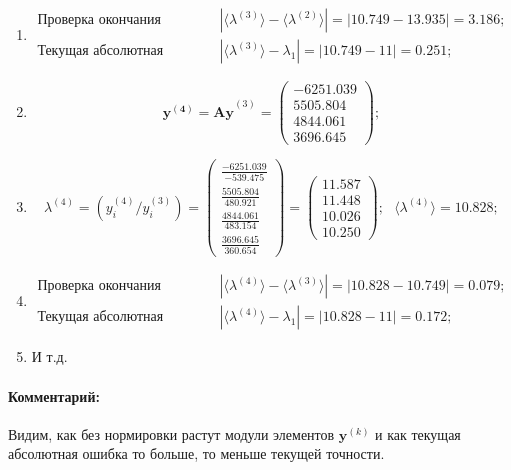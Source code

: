 \begin{enumerate}
\item $$
    \begin{matrix}
        \text{Проверка окончания алгоритма: }&|\langle\lambda^{(3)}\rangle - \langle\lambda^{(2)}\rangle| = |10.749 -13.935| =   \mathbf{3.186};\\
        \text{Текущая абсолютная ошибка: }&|\langle\lambda^{(3)}\rangle - \lambda_1| = |10.749 - 11| = \mathbf{0.251};
    \end{matrix}$$



\item $$
    \mathbf{y^{(4)} =Ay}^{(3)} = \begin{pmatrix}-6251.039\\5505.804\\4844.061\\3696.645\end{pmatrix};$$

\item $$
    \lambda^{(4)} =\left( y^{(4)}_i / y^{(3)}_i \right) =
    \begin{pmatrix} \frac{-6251.039}{-539.475}\\\frac{5505.804}{480.921}\\\frac{4844.061}{483.154}\\\frac{3696.645}{360.654}\end{pmatrix}=
    \begin{pmatrix} 11.587\\11.448\\10.026\\10.250\end{pmatrix}; ~~~
    \langle\lambda^{(4)}\rangle = 10.828;$$

\item $$
    \begin{matrix}
        \text{Проверка окончания алгоритма: }&|\langle\lambda^{(4)}\rangle - \langle\lambda^{(3)}\rangle| = |10.828-10.749|    = \mathbf{0.079};\\
        \text{Текущая абсолютная ошибка: }&|\langle\lambda^{(4)}\rangle - \lambda_1| = |10.828 - 11| = \mathbf{0.172};
    \end{matrix}$$

\item И т.д.
\end{enumerate}
\paragraph{Комментарий:} Видим, как без нормировки растут модули элементов $\mathbf{y}^{(k)}$ и как текущая абсолютная ошибка то больше, то меньше текущей точности.



